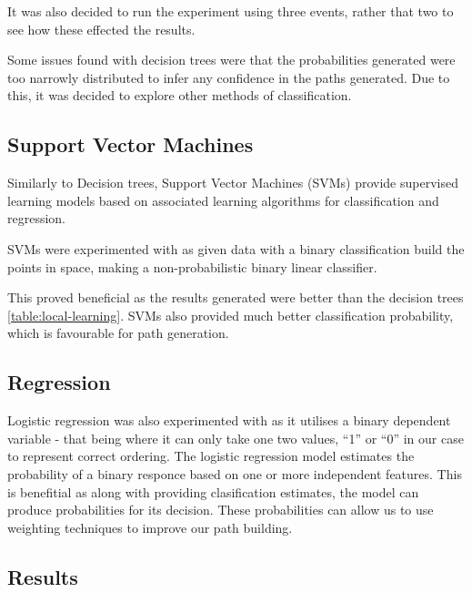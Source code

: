 \documentclass[bsc,frontabs,twoside,singlespacing,parskip,deptreport]{infthesis}     %
\begin{document}
It was also decided to run the experiment using three events, rather that two to see how these
effected the results. 

Some issues found with decision trees were that the probabilities generated were too narrowly distributed
to infer any confidence in the paths generated. Due to this, it was decided to explore other methods of
classification.

\subsection{Support Vector Machines}
Similarly to Decision trees, Support Vector Machines (SVMs) provide supervised learning models based on
associated learning algorithms for classification and regression.

SVMs were experimented with as given data with a binary classification build the points in space,
making a non-probabilistic binary linear classifier.

This proved beneficial as the results generated were better than the decision trees \ref{table:local-learning}.
SVMs also provided much better classification probability, which is favourable for path generation.
\vspace{4em}
\subsection{Regression}
Logistic regression was also experimented with as it utilises a binary dependent variable - that being where it
can only take one two values, ``1'' or ``0'' in our case to represent correct ordering.
The logistic regression model estimates the probability of a binary responce based on one or more independent features.
This is benefitial as along with providing clasification estimates, the model can produce probabilities for its
decision. These probabilities can allow us to use weighting techniques to improve our path building.

\subsection{Results}\label{sec:local-results}
\end{document}
